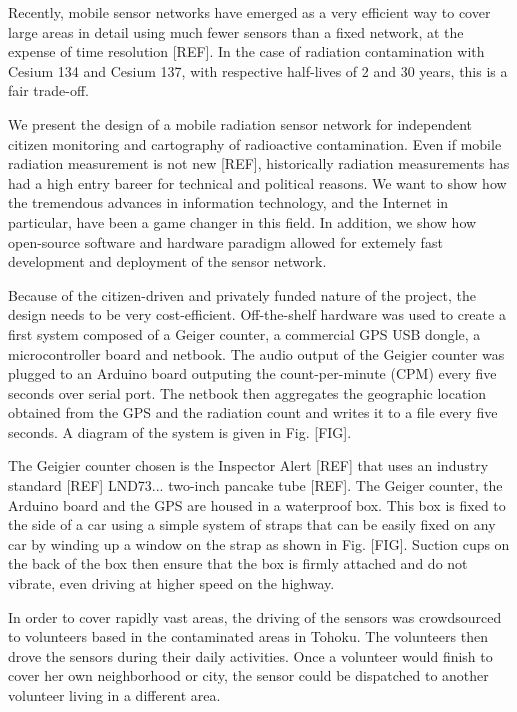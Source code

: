 \documentclass[11pt]{article}
\begin{document}
Recently, mobile sensor networks have emerged as a very efficient way to cover large areas in detail using much fewer sensors than a fixed network, at the expense
of time resolution [REF]. In the case of radiation contamination with Cesium 134 and Cesium 137, with respective half-lives of 2 and 30 years, this is a fair trade-off.

We present the design of a mobile radiation sensor network for independent citizen monitoring and cartography of radioactive contamination.
Even if mobile radiation measurement is not new [REF], historically radiation measurements has had a high entry bareer for technical and political reasons.
We want to show how the tremendous advances in information technology, and the Internet in particular, have been a game changer in this field. In addition, we show how
open-source software and hardware paradigm allowed for extemely fast development and deployment of the sensor network.

Because of the citizen-driven and privately funded nature of the project, the design needs to be very cost-efficient. Off-the-shelf hardware was used to create
a first system composed of a Geiger counter, a commercial GPS USB dongle, a microcontroller board and netbook. The audio output of the Geigier counter
was plugged to an Arduino board outputing the count-per-minute (CPM) every five seconds over serial port. The netbook then aggregates the geographic location
obtained from the GPS and the radiation count and writes it to a file every five seconds. A diagram of the system is given in Fig. [FIG].

The Geigier counter chosen is the Inspector Alert [REF] that uses an industry standard [REF] LND73... two-inch pancake tube [REF].
The Geiger counter, the Arduino board and the GPS are housed in a waterproof box.
This box is fixed to the side of a car using a simple system of straps that can be easily fixed on any car by winding up a window on the strap as shown in Fig. [FIG].
Suction cups on the back of the box then ensure that the box is firmly attached and do not vibrate, even driving at higher speed on the highway.

In order to cover rapidly vast areas, the driving of the sensors was crowdsourced to volunteers based in the contaminated areas in Tohoku.
The volunteers then drove the sensors during their daily activities. Once a volunteer would finish to cover her own neighborhood or city, the sensor
could be dispatched to another volunteer living in a different area.
\end{document}
